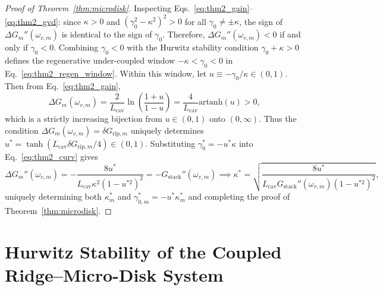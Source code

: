 \documentclass[11pt,letterpaper]{article}
\begin{document}
\begin{proof}[Proof of Theorem~\ref{thm:microdisk}]
Inspecting Eqs.~\eqref{eq:thm2_gain}--\eqref{eq:thm2_gvd}: since $\kappa > 0$ and $(\gamma_0^2 - \kappa^2)^2 > 0$ for all $\gamma_0 \neq \pm\kappa$, the sign of $\Delta G_m''(\omega_{v,m})$ is identical to the sign of $\gamma_0$. Therefore, $\Delta G_m''(\omega_{v,m}) < 0$ if and only if $\gamma_0 < 0$. Combining $\gamma_0 < 0$ with the Hurwitz stability condition $\gamma_0 + \kappa > 0$ defines the regenerative under-coupled window $-\kappa < \gamma_0 < 0$ in Eq.~\eqref{eq:thm2_regen_window}. Within this window, let $u \equiv -\gamma_0/\kappa \in (0, 1)$. Then from Eq.~\eqref{eq:thm2_gain},
\begin{equation}
\Delta G_m(\omega_{v,m}) = \frac{2}{L_{\mathrm{cav}}}\ln\!\left(\frac{1 + u}{1 - u}\right) = \frac{4}{L_{\mathrm{cav}}}\mathrm{artanh}(u) > 0,
\label{eq:appB_u_gain}
\end{equation}
which is a strictly increasing bijection from $u \in (0, 1)$ onto $(0, \infty)$. Thus the condition $\Delta G_m(\omega_{v,m}) = \delta G_{\mathrm{rip},m}$ uniquely determines $u^* = \tanh(L_{\mathrm{cav}}\delta G_{\mathrm{rip},m}/4) \in (0, 1)$. Substituting $\gamma_0^* = -u^* \kappa$ into Eq.~\eqref{eq:thm2_curv} gives
\begin{equation}
\Delta G_m''(\omega_{v,m}) = -\frac{8 u^*}{L_{\mathrm{cav}}\kappa^2 (1 - u^{*2})^2} = -G_{\mathrm{stack}}''(\omega_{v,m}) \implies \kappa^* = \sqrt{\frac{8 u^*}{L_{\mathrm{cav}} G_{\mathrm{stack}}''(\omega_{v,m})(1 - u^{*2})^2}},
\label{eq:appB_kappa_star}
\end{equation}
uniquely determining both $\kappa_m^*$ and $\gamma_{0,m}^* = -u^* \kappa_m^*$ and completing the proof of Theorem~\ref{thm:microdisk}.
\end{proof}

\section{Hurwitz Stability of the Coupled Ridge--Micro-Disk System}
\label{app:tcmt_stability}
\end{document}
